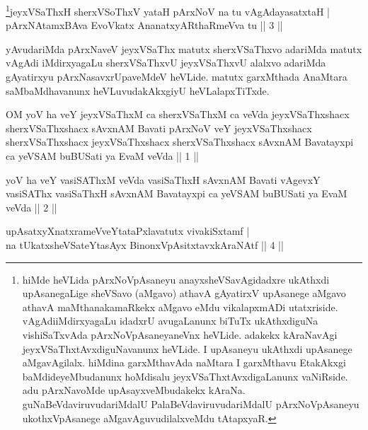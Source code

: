 \begin{shl}
\footnote{hiMde heVLida pArxNoVpAsaneyu anayxsheVSavAgidadxre  ukAthxdi upAsanegaLige sheVSavo (aMgavo) athavA gAyatirxV upAsanege  aMgavo athavA maMthanakamaRkekx aMgavo eMdu vikalapxmADi  utatxriside. vAgAdiiMdirxyagaLu idadxrU avugaLanunx biTuTx ukAthxdiguNa vishiSaTxvAda pArxNoVpAsaneyaneVnx heVLide. adakekx kAraNavAgi jeyxVSaThxtAvxdiguNavanunx heVLide. I upAsaneyu ukAthxdi upAsanege  aMgavAgilalx. hiMdina garxMthavAda naMtara I garxMthavu EtakAkxgi  baMdideyeMbudanunx hoMdisalu jeyxVSaThxtAvxdigaLanunx vaNiRside. adu  pArxNavoMde upAsayxveMbudakekx kAraNa. guNaBeVdaviruvudariMdalU  PalaBeVdaviruvudariMdalU pArxNoVpAsaneyu ukothxVpAsanege  aMgavAguvudilalxveMdu tAtapxyaR.}jeyxVSaThxH sherxVSoThxV yataH pArxNoV na tu vAgAdayasatxtaH | \\
pArxNAtamxBAva EvoVkatx AnanatxyARthaRmeVva tu \hfill|| 3 || 
\end{shl}

\begin{artha} 
yAvudariMda pArxNaveV jeyxVSaThx matutx sherxVSaThxvo adariMda matutx 
vAgAdi iMdirxyagaLu sherxVSaThxvU jeyxVSaThxvU alalxvo adariMda 
gAyatirxyu pArxNasavxrUpaveMdeV heVLide. matutx garxMthada AnaMtara 
saMbaMdhavanunx heVLuvudakAkxgiyU heVLalapxTiTxde.
\end{artha}

\begin{kandikeshl}
OM yoV ha veY jeyxVSaThxM ca sherxVSaThxM ca veVda jeyxVSaThxshacx sherxVSaThxshacx sAvxnAM Bavati pArxNoV veY jeyxVSaThxshacx sherxVSaThxshacx jeyxVSaThxshacx sherxVSaThxshacx sAvxnAM Bavatayxpi ca yeVSAM buBUSati ya EvaM veVda || 1 ||
\end{kandikeshl}

\begin{kandikeshl}
yoV ha veY vasiSAThxM veVda vasiSaThxH sAvxnAM Bavati vAgevxY vasiSAThx vasiSaThxH sAvxnAM Bavatayxpi ca yeVSAM buBUSati ya EvaM veVda || 2 ||
\end{kandikeshl}

\begin{shl}
upAsatxyXnatxrameVveYtataPxlavatutx vivakiSxtamf | \\
na tUkatxsheVSateYtasAyx BinonxVpAsitxtavxkAraNAtf \hfill|| 4 || 
\end{shl}

